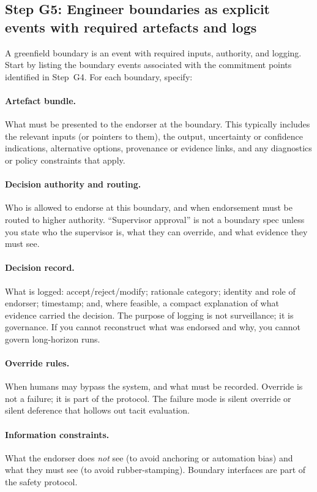 \subsection{Step G5: Engineer boundaries as explicit events with required artefacts and logs}

A greenfield boundary is an event with required inputs, authority, and logging. Start by listing the boundary events associated with the commitment points identified in Step~G4. For each boundary, specify:

\paragraph{Artefact bundle.}
What must be presented to the endorser at the boundary. This typically includes the relevant inputs (or pointers to them), the output, uncertainty or confidence indications, alternative options, provenance or evidence links, and any diagnostics or policy constraints that apply.

\paragraph{Decision authority and routing.}
Who is allowed to endorse at this boundary, and when endorsement must be routed to higher authority. ``Supervisor approval'' is not a boundary spec unless you state who the supervisor is, what they can override, and what evidence they must see.

\paragraph{Decision record.}
What is logged: accept/reject/modify; rationale category; identity and role of endorser; timestamp; and, where feasible, a compact explanation of what evidence carried the decision. The purpose of logging is not surveillance; it is governance. If you cannot reconstruct what was endorsed and why, you cannot govern long-horizon runs.

\paragraph{Override rules.}
When humans may bypass the system, and what must be recorded. Override is not a failure; it is part of the protocol. The failure mode is silent override or silent deference that hollows out tacit evaluation.

\paragraph{Information constraints.}
What the endorser does \emph{not} see (to avoid anchoring or automation bias) and what they must see (to avoid rubber-stamping). Boundary interfaces are part of the safety protocol.

